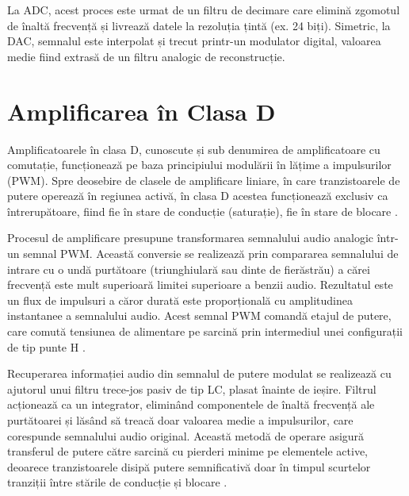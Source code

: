La ADC, acest proces este urmat de un filtru de decimare care elimină zgomotul de înaltă frecvență și livrează datele la rezoluția țintă (ex. 24 biți). Simetric, la DAC, semnalul este interpolat și trecut printr-un modulator digital, valoarea medie fiind extrasă de un filtru analogic de reconstrucție.

\section{Amplificarea în Clasa D}
Amplificatoarele în clasa D, cunoscute și sub denumirea de amplificatoare cu comutație, funcționează pe baza principiului modulării în lățime a impulsurilor (PWM). Spre deosebire de clasele de amplificare liniare, în care tranzistoarele de putere operează în regiunea activă, în clasa D acestea funcționează exclusiv ca întrerupătoare, fiind fie în stare de conducție (saturație), fie în stare de blocare \cite{self2006audio}.

Procesul de amplificare presupune transformarea semnalului audio analogic într-un semnal PWM. Această conversie se realizează prin compararea semnalului de intrare cu o undă purtătoare (triunghiulară sau dinte de fierăstrău) a cărei frecvență este mult superioară limitei superioare a benzii audio. Rezultatul este un flux de impulsuri a căror durată este proporțională cu amplitudinea instantanee a semnalului audio. Acest semnal PWM comandă etajul de putere, care comută tensiunea de alimentare pe sarcină prin intermediul unei configurații de tip punte H \cite{douglasself}.

Recuperarea informației audio din semnalul de putere modulat se realizează cu ajutorul unui filtru trece-jos pasiv de tip LC, plasat înainte de ieșire. Filtrul acționează ca un integrator, eliminând componentele de înaltă frecvență ale purtătoarei și lăsând să treacă doar valoarea medie a impulsurilor, care corespunde semnalului audio original. Această metodă de operare asigură transferul de putere către sarcină cu pierderi minime pe elementele active, deoarece tranzistoarele disipă putere semnificativă doar în timpul scurtelor tranziții între stările de conducție și blocare \cite{self2006audio}.
